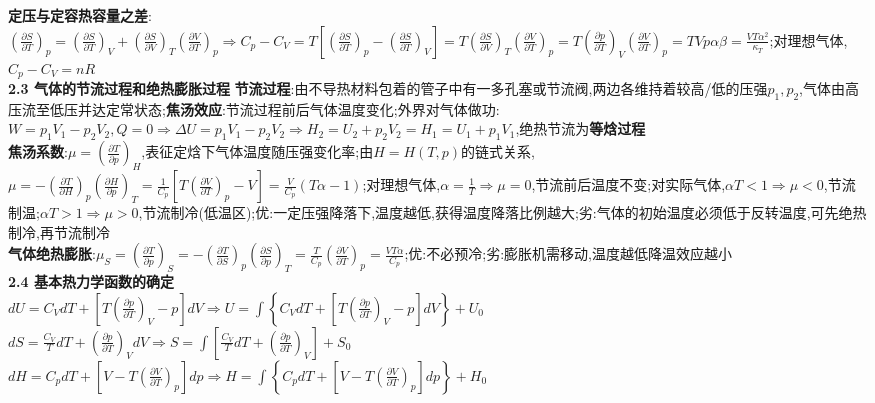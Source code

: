 \documentclass[10pt,a4paper]{article}
\begin{document}
\begin{multicols}{2}
\textbf{定压与定容热容量之差}:$\left(\frac{\partial S}{\partial T}\right)_p=\left(\frac{\partial S}{\partial T}\right)_V+\left(\frac{\partial S}{\partial V}\right)_T\left(\frac{\partial V}{\partial T}\right)_p\Rightarrow C_p-C_V=T\left[\left(\frac{\partial S}{\partial T}\right)_p-\left(\frac{\partial S}{\partial T}\right)_V\right]=T\left(\frac{\partial S}{\partial V}\right)_T\left(\frac{\partial V}{\partial T}\right)_p=T\left(\frac{\partial p}{\partial T}\right)_V\left(\frac{\partial V}{\partial T}\right)_p=TVp\alpha\beta=\frac{VT\alpha^2}{\kappa_T}$;对理想气体,$C_p-C_V=nR$\\
\textbf{2.3 气体的节流过程和绝热膨胀过程}
\textbf{节流过程}:由不导热材料包着的管子中有一多孔塞或节流阀,两边各维持着较高/低的压强$p_1,p_2$,气体由高压流至低压并达定常状态;\textbf{焦汤效应}:节流过程前后气体温度变化;外界对气体做功:$W=p_1V_1-p_2V_2,Q=0\Rightarrow\Delta U=p_1V_1-p_2V_2\Rightarrow H_2=U_2+p_2V_2=H_1=U_1+p_1V_1$,绝热节流为\textbf{等焓过程}\\
\textbf{焦汤系数}:$\mu=\left(\frac{\partial T}{\partial p}\right)_H$,表征定焓下气体温度随压强变化率;由$H=H(T,p)$的链式关系,$\mu=-\left(\frac{\partial T}{\partial H}\right)_p\left(\frac{\partial H}{\partial p}\right)_T=\frac{1}{C_p}\left[T\left(\frac{\partial V}{\partial T}\right)_p-V\right]=\frac{V}{C_p}(T\alpha-1)$;对理想气体,$\alpha=\frac{1}{T}\Rightarrow\mu=0$,节流前后温度不变;对实际气体,$\alpha T<1\Rightarrow\mu<0$,节流制温;$\alpha T>1\Rightarrow\mu>0$,节流制冷(低温区);优:一定压强降落下,温度越低,获得温度降落比例越大;劣:气体的初始温度必须低于反转温度,可先绝热制冷,再节流制冷\\
\textbf{气体绝热膨胀}:$\mu_S=\left(\frac{\partial T}{\partial p}\right)_S=-\left(\frac{\partial T}{\partial S}\right)_p\left(\frac{\partial S}{\partial p}\right)_T=\frac{T}{C_p}\left(\frac{\partial V}{\partial T}\right)_p=\frac{VT\alpha}{C_p}$;优:不必预冷;劣:膨胀机需移动,温度越低降温效应越小\\
\textbf{2.4 基本热力学函数的确定}\\
$dU=C_VdT+\left[T\left(\frac{\partial p}{\partial T}\right)_V-p\right]dV\Rightarrow U=\int\left\{C_VdT+\left[T\left(\frac{\partial p}{\partial T}\right)_V-p\right]dV\right\}+U_0$\\
$dS=\frac{C_V}{T}dT+\left(\frac{\partial p}{\partial T}\right)_VdV\Rightarrow S=\int\left[\frac{C_V}{T}dT+\left(\frac{\partial p}{\partial T}\right)_V\right]+S_0$\\
$dH=C_pdT+\left[V-T\left(\frac{\partial V}{\partial T}\right)_p\right]dp\Rightarrow H=\int\left\{C_pdT+\left[V-T\left(\frac{\partial V}{\partial T}\right)_p\right]dp\right\}+H_0$\\

\end{multicols}
\end{document}
